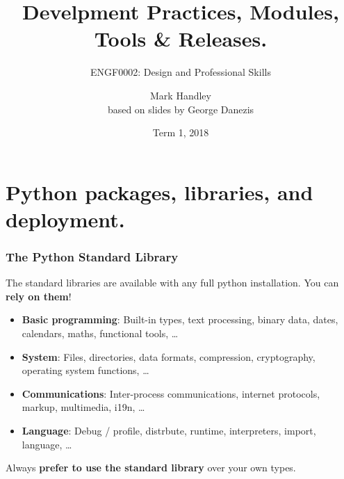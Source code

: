 \documentclass{beamer} %
\author{Mark Handley\\
  {\small based on slides by George Danezis}}
\title{Develpment Practices, Modules, Tools \& Releases.}
\subtitle{ENGF0002: Design and Professional Skills }
\date{Term 1, 2018}
\newcommand\emc[1]{\textcolor{midred}{\textbf{#1}}}
\begin{document}
\nobibliography*


\frame{
\titlepage
}

\section{Python packages, libraries, and deployment.}



\begin{frame}

\frametitle{The Python Standard Library}

The standard libraries are available with any full python installation. You can \emc{rely on them}!
\begin{itemize}
  \item \emc{Basic programming}: Built-in types, text processing, binary data, dates, calendars, maths, functional tools, \ldots
  \item \emc{System}: Files, directories, data formats, compression, cryptography, operating system functions, \ldots
  \item \emc{Communications}: Inter-process communications, internet protocols, markup, multimedia, i19n, \ldots
  \item \emc{Language}: Debug / profile, distrbute, runtime, interpreters, import, language, \ldots
  \end{itemize}

Always \emc{prefer to use the standard library} over your own types.

\end{frame}
\end{document}
